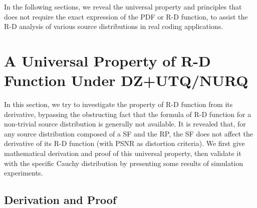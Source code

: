 \documentclass[smallabstract,smallcaptions]{dccpaper}
\begin{document}
In the following sections, we reveal the universal property and principles that does not require the exact expression of the PDF or R-D function, to assist the R-D analysis of various source distributions in real coding applications.

\section{A Universal Property of R-D Function Under DZ+UTQ/NURQ}
\label{sec:property}

In this section, we try to investigate the property of R-D function from its derivative, bypassing the obstructing fact that the formula of R-D function for a non-trivial source distribution is generally not available. It is revealed that, for any source distribution composed of a SF and the RP, the SF does not affect the derivative of its R-D function (with PSNR as distortion criteria). We first give mathematical derivation and proof of this universal property, then validate it with the specific Cauchy distribution by presenting some results of simulation experiments.

\subsection{Derivation and Proof}
\end{document}
